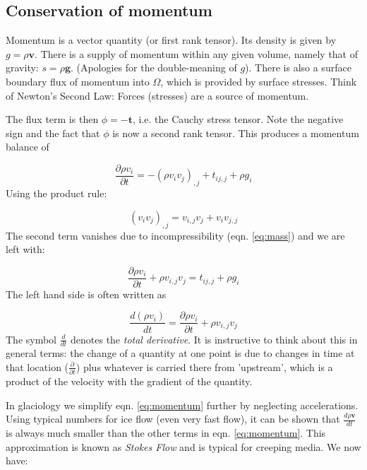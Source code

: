 \documentclass[12pt, openany]{memoir}
\newcommand{\pder}[2]{\ensuremath{\frac{\partial #1}{\partial #2}}}
\begin{document}
\subsection{Conservation of momentum}

Momentum is a vector quantity (or first rank tensor). Its density is
given by $g = \rho \mathbf{v}$. There is a supply of momentum within
any given volume, namely that of gravity: $s = \rho \mathbf{g}$. (Apologies for
the double-meaning of $g$). There is also a surface boundary flux of
momentum into $\Omega$, which is provided by surface stresses. Think
of Newton's Second Law: Forces (stresses) are a source of momentum.

The flux term is then $\phi = -\mathbf{t}$, i.e. the Cauchy stress
tensor. Note the negative sign and the fact that $\phi$ is now a
second rank tensor. This produces a momentum balance of 

\begin{equation} \label{eq:momentum1}
\pder{\rho v_i}{t} = - (\rho v_iv_j)_{,j} + t_{ij,j} + \rho g_i
\end{equation}
Using the product rule: 

\begin{equation}
(v_iv_j)_{,j} = v_{i,j}v_j + v_iv_{j,j}
\end{equation}
The second term vanishes due to incompressibility (eqn. \ref{eq:mass})
and we are left with:

\begin{equation}
\pder{\rho v_i}{t} + \rho v_{i,j}v_j = t_{ij,j} + \rho g_i
\end{equation}
The left hand side is often written as 

\begin{equation} \label{eq:momentum}
\frac{d (\rho v_i)}{dt} = \pder{\rho v_i}{t} + \rho v_{i,j}v_j
\end{equation}
The symbol $\frac{d}{dt}$ denotes the \emph{total derivative}. It is
instructive to think about this in general terms: the change of a
quantity at one point is due to changes in time at that location
($\pder{}{t}$) plus whatever is carried there from 'upstream', which
is a product of the velocity with the gradient of the quantity.

In glaciology we simplify eqn. \ref{eq:momentum} further by neglecting
accelerations. Using typical numbers for ice flow (even very fast
flow), it can be shown that $\frac{d \rho \mathbf{v}}{dt}$ is always
much smaller than the other terms in eqn. \ref{eq:momentum}. This
approximation is known as \emph{Stokes Flow} and is typical for
creeping media. We now have:
\end{document}
